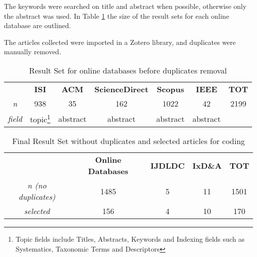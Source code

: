 The keywords were searched on title and abstract when possible, otherwise only the abstract was used. In Table \ref{table:result_1} the size of the result sets for each online database are outlined.

The articles collected were imported in a Zotero library, and duplicates were manually removed.

\begin{savenotes}
\begin{table}[ht]
\setlength{\tabcolsep}{8pt}
\centering
\caption{Result Set for online databases before duplicates removal}
\label{table:result_1}
\begin{tabular}{cccccc|c}
 & \cellcolor[HTML]{EFEFEF}\textbf{ISI} & \cellcolor[HTML]{EFEFEF}\textbf{ACM} & \cellcolor[HTML]{EFEFEF}\textbf{ScienceDirect} & \cellcolor[HTML]{EFEFEF}\textbf{Scopus} & \cellcolor[HTML]{EFEFEF}\textbf{IEEE} & \textbf{TOT} \\
\textit{n} & 938 & 35 & 162 & 1022 & 42 & 2199 \\
\textit{field} & topic\footnote{Topic fields include Titles, Abstracts, Keywords and Indexing fields such as Systematics, Taxonomic Terms and Descriptors} & abstract & abstract & abstract & abstract & 
\end{tabular}
\end{table}
\end{savenotes}

\begin{table}[ht]
\setlength{\tabcolsep}{8pt}
\centering
\caption{Final Result Set without duplicates and selected articles for coding}
\label{table:result_2}
\begin{tabular}{cccc|c}
 & \cellcolor[HTML]{EFEFEF}\textbf{Online Databases} & \cellcolor[HTML]{EFEFEF}\textbf{IJDLDC} & \cellcolor[HTML]{EFEFEF}\textbf{IxD\&A} & \textbf{TOT} \\
\textit{n (no duplicates)} & 1485 & 5 & 11 & 1501 \\
\textit{selected} & 156 & 4 & 10 & 170
\end{tabular}
\end{table}